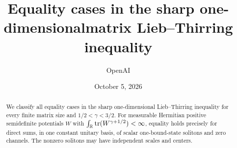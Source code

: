 \documentclass[11pt]{article}
\title{Equality cases in the sharp one-dimensional\newline matrix Lieb--Thirring inequality}
\author{OpenAI}
\date{October 5, 2026}
\begin{document}
\maketitle
\begin{abstract}
We classify all equality cases in the sharp one-dimensional Lieb--Thirring
inequality for every finite matrix size and $1/2<\gamma<3/2$. For measurable
Hermitian positive semidefinite potentials $W$ with
$\int_\mathbb R\operatorname{tr}(W^{\gamma+1/2})<\infty$, equality holds precisely for direct sums,
in one constant unitary basis, of scalar one-bound-state solitons and zero
channels. The nonzero solitons may have independent scales and centers.
\end{abstract}
\setcounter{tocdepth}{1}
\tableofcontents
\clearpage






\appendix



\end{document}
